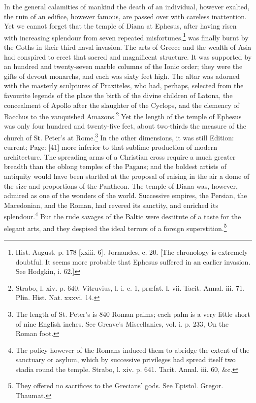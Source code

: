 In the general calamities of mankind the death of an individual, however exalted, the ruin of an edifice, however famous, are passed over with careless inattention. Yet we cannot forget that the temple of Diana at Ephesus, after having risen with increasing splendour from seven repeated misfortunes,\footnote{Hist. August. p. 178 [xxiii. 6]. Jornandes, c. 20. [The chronology is extremely doubtful. It seems more probable that Ephesus suffered in an earlier invasion. See Hodgkin, i. 62.]} was finally burnt by the Goths in their third naval invasion. The arts of Greece and the wealth of Asia had conspired to erect that sacred and magnificent structure. It was supported by an hundred and twenty-seven marble columns of the Ionic order; they were the gifts of devout monarchs, and each was sixty feet high. The altar was adorned with the masterly sculptures of Praxiteles, who had, perhaps, selected from the favourite legends of the place the birth of the divine children of Latona, the concealment of Apollo after the slaughter of the Cyclops, and the clemency of Bacchus to the vanquished Amazons.\footnote{Strabo, l. xiv. p. 640. Vitruvius, l. i. c. 1, præfat. l. vii. Tacit. Annal. iii. 71. Plin. Hist. Nat. xxxvi. 14.} Yet the length of the temple of Ephesus was only four hundred and twenty-five feet, about two-thirds the measure of the church of St. Peter\texthebrew{}’s at Rome.\footnote{The length of St. Peter\texthebrew{}’s is 840 Roman palms; each palm is a very little short of nine English inches. See Greave\texthebrew{}’s Miscellanies, vol. i. p. 233, On the Roman foot.} In the other dimensions, it was still Edition: current; Page: [41] more inferior to that sublime production of modern architecture. The spreading arms of a Christian cross require a much greater breadth than the oblong temples of the Pagans; and the boldest artists of antiquity would have been startled at the proposal of raising in the air a dome of the size and proportions of the Pantheon. The temple of Diana was, however, admired as one of the wonders of the world. Successive empires, the Persian, the Macedonian, and the Roman, had revered its sanctity, and enriched its splendour.\footnote{The policy however of the Romans induced them to abridge the extent of the sanctuary or asylum, which by successive privileges had spread itself two stadia round the temple. Strabo, l. xiv. p. 641. Tacit. Annal. iii. 60, \&c.} But the rude savages of the Baltic were destitute of a taste for the elegant arts, and they despised the ideal terrors of a foreign superstition.\footnote{They offered no sacrifices to the Grecians\texthebrew{}’ gods. See Epistol. Gregor. Thaumat.}

